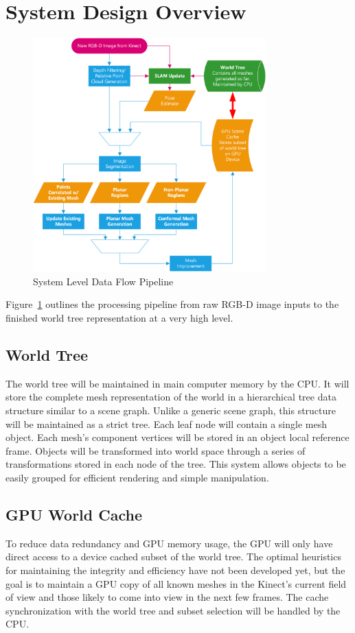 \documentclass[english]{article}
\begin{document}
\section{System Design Overview}
\begin{figure}[systemdiagram]
    \centering
    \includegraphics[width=0.8\textwidth]{Diagrams/TopLevelPipeline.png}
    \caption{System Level Data Flow Pipeline}
    \label{fig:systemdiagram}
\end{figure}

Figure~\ref{fig:systemdiagram} outlines the processing pipeline from raw RGB-D image inputs to the finished world tree representation at a very high level. 

\subsection{World Tree}
The world tree will be maintained in main computer memory by the CPU. It will store the complete mesh representation of the world in a hierarchical tree data structure similar to a scene graph. Unlike a generic scene graph, this structure will be maintained as a strict tree. Each leaf node will contain a single mesh object. Each mesh's component vertices will be stored in an object local reference frame. Objects will be transformed into world space through a series of transformations stored in each node of the tree. This system allows objects to be easily grouped for efficient rendering and simple manipulation.

\subsection{GPU World Cache}
To reduce data redundancy and GPU memory usage, the GPU will only have direct access to a device cached subset of the world tree. The optimal heuristics for maintaining the integrity and efficiency have not been developed yet, but the goal is to maintain a GPU copy of all known meshes in the Kinect's current field of view and those likely to come into view in the next few frames. The cache synchronization with the world tree and subset selection will be handled by the CPU.
\end{document}
